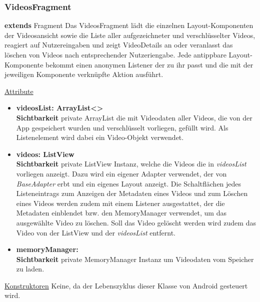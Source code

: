 \subsubsection{VideosFragment} \label{app:klasse:VideosFragment}
\textbf{extends} Fragment \newline
Das VideosFragment lädt die einzelnen Layout-Komponenten der Videosansicht sowie die Liste aller aufgezeichneter und verschlüsselter Videos, reagiert auf Nutzereingaben und zeigt VideoDetails an oder veranlasst das löschen von Videos nach entsprechender Nutzeriengabe. Jede antippbare Layout-Komponente bekommt einen anonymen Listener der zu ihr passt und die mit der jeweiligen Komponente verknüpfte Aktion ausführt.
\newline

\underline{Attribute}
\begin{itemize}
\itemsep0pt
\item \textbf{videosList: ArrayList<> } \hfill\\ 
\textbf{Sichtbarkeit} private \newline
ArrayList die mit Videodaten aller Videos, die von der App gespeichert wurden und verschlüsselt vorliegen, gefüllt wird. Als Listenelement wird dabei ein Video-Objekt verwendet.

\item \textbf{videos: ListView} \hfill\\ 
\textbf{Sichtbarkeit} private \newline
ListView Instanz, welche die Videos die in \textit{videosList} vorliegen anzeigt. Dazu wird ein eigener Adapter verwendet, der von \textit{BaseAdapter} erbt und ein eigenes Layout anzeigt. Die Schaltflächen jedes Listeneintrags zum Anzeigen der Metadaten eines Videos und zum Löschen eines Videos werden zudem mit einem Listener ausgestattet, der die Metadaten einblendet bzw. den MemoryManager verwendet, um das ausgewählte Video zu löschen. Soll das Video gelöscht werden wird zudem das Video von der ListView und der \textit{videosList} entfernt.

\item \textbf{memoryManager: } \hfill\\ 
\textbf{Sichtbarkeit} private \newline
MemoryManager Instanz um Videodaten vom Speicher zu laden.

\end{itemize}

\underline{Konstruktoren}\newline
\indent Keine, da der Lebenszyklus dieser Klasse von Android gesteuert wird.\newline

